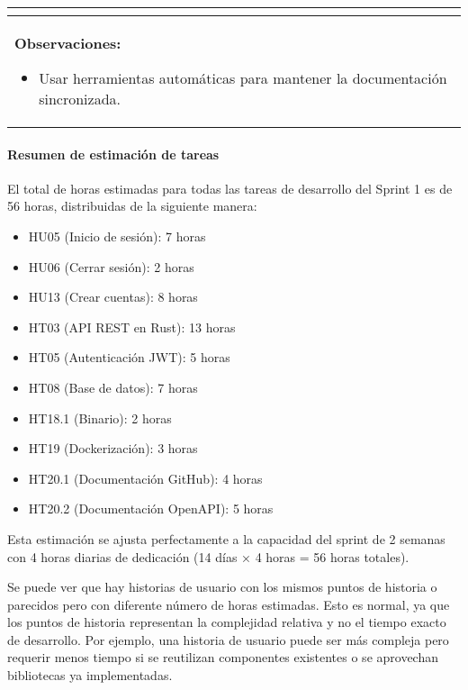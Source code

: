 \begin{table}[H]
\begin{center}
\begin{tabularx}{\textwidth}{|l|X|l|}
{\begin{itemize}
                    \end{itemize}
            }\\
            \hline
            \multicolumn{3}{|p{\textwidth}|}{
                \textbf{Observaciones:}
                \begin{itemize}
                    \item Usar herramientas automáticas para mantener la documentación sincronizada.
                \end{itemize}
            }\\
            \hline
        \end{tabularx}
    \end{center}
\end{table}

\paragraph{Resumen de estimación de tareas}

El total de horas estimadas para todas las tareas de desarrollo del Sprint 1 es de 56 horas, distribuidas de la siguiente manera:

\begin{itemize}
    \item HU05 (Inicio de sesión): 7 horas
    \item HU06 (Cerrar sesión): 2 horas  
    \item HU13 (Crear cuentas): 8 horas
    \item HT03 (API REST en Rust): 13 horas
    \item HT05 (Autenticación JWT): 5 horas
    \item HT08 (Base de datos): 7 horas
    \item HT18.1 (Binario): 2 horas
    \item HT19 (Dockerización): 3 horas
    \item HT20.1 (Documentación GitHub): 4 horas
    \item HT20.2 (Documentación OpenAPI): 5 horas
\end{itemize}

Esta estimación se ajusta perfectamente a la capacidad del sprint de 2 semanas con 4 horas diarias de dedicación (14 días × 4 horas = 56 horas totales).

Se puede ver que hay historias de usuario con los mismos puntos de historia o parecidos pero con diferente número de horas estimadas. Esto es normal, ya que los puntos de historia representan la complejidad relativa y no el tiempo exacto de desarrollo. Por ejemplo, una historia de usuario puede ser más compleja pero requerir menos tiempo si se reutilizan componentes existentes o se aprovechan bibliotecas ya implementadas.
